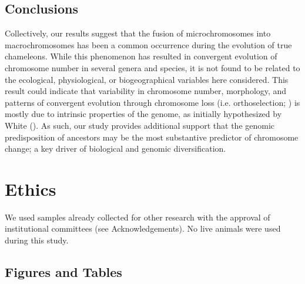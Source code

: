 \documentclass[a4paper, 12pt]{article}
\begin{document}
\subsection{Conclusions}
Collectively, our results suggest that the fusion of microchromosomes into macrochromosomes has been a common occurrence during the evolution of true chameleons. 
While this phenomenon has resulted in convergent evolution of chromosome number in several genera and species, it is not found to be related to the ecological, physiological, or biogeographical variables here considered. 
This result could indicate that variability in chromosome number, morphology, and patterns of convergent evolution through chromosome loss (i.e. orthoselection; \citealt{white1973}) is mostly due to intrinsic properties of the genome, as initially hypothesized by White (\citeyear{white1975chromosome}). 
As such, our study provides additional support that the genomic predisposition of ancestors may be the most substantive predictor of chromosome change; a key driver of biological and genomic diversification.

\section{Ethics}
We used samples already collected for other research with the approval of institutional committees (see Acknowledgements). No live animals were used during this study.




\newpage
\begin{landscape}
\section{Figures and Tables}



\end{landscape}
\end{document}
